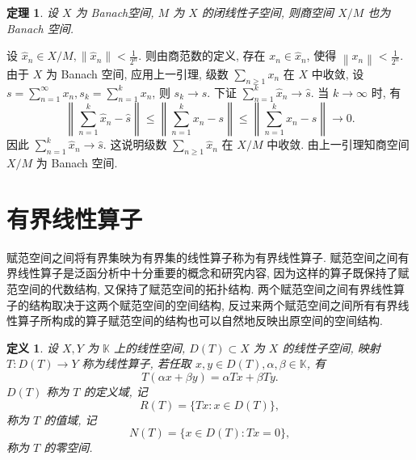 \documentclass[openany]{ctexbook}
\makeatletter
\theoremstyle{kaiti}
\newtheorem{definition}{定义}[section]
\newtheorem{theorem}{定理}[section]
\theoremstyle{normal}
\renewenvironment{proof}[1][\proofname]{\par
    \pushQED{\qed}%
    \normalfont \topsep6\p@\@plus6\p@\relax
    \trivlist
    \item\relax
    {\heiti #1}\hspace{2\labelsep}\ignorespaces
  }{%
    \popQED\endtrivlist\@endpefalse
  }
\makeatother
\begin{document}
\begin{theorem}
  设 $X$ 为 Banach空间, $M$ 为 $X$ 的闭线性子空间, 则商空间 $X / M$ 也为 Banach 空间.
\end{theorem}

\begin{proof}
设 $\hat{x}_n \in X / M,\left\|\hat{x}_n\right\|<\frac{1}{2^n}$. 则由商范数的定义, 存在 $x_n \in \hat{x}_n$, 使得 $\left\|x_n\right\|<\frac{1}{2^n}$. 由于 $X$ 为 Banach 空间, 应用上一引理, 级数 $\sum_{n \geqslant 1} x_n$ 在 $X$ 中收敛, 设 $s=\sum_{n=1}^{\infty} x_n, s_{k}=\sum_{n=1}^{k} x_n$, 则 $s_{k} \rightarrow s$. 下证 $\sum_{n=1}^{k} \hat{x}_n \rightarrow \hat{s}$. 当 $k \rightarrow \infty$ 时, 有
$$
\left\|\sum_{n=1}^{k} \hat{x}_n-\hat{s}\right\| \leqslant\left\|\sum_{n=1}^{k} x_n-s\right\| \leqslant\left\|\sum_{n=1}^{k} x_n-s\right\| \rightarrow 0.
$$
因此 $\sum_{n=1}^{k} \hat{x}_n \rightarrow \hat{s}$. 这说明级数 $\sum_{n \geqslant 1} \hat{x}_n$ 在 $X / M$ 中收敛. 由上一引理知商空间 $X / M$ 为 Banach 空间.
\end{proof}

\section{有界线性算子}

赋范空间之间将有界集映为有界集的线性算子称为有界线性算子. 赋范空间之间有界线性算子是泛函分析中十分重要的概念和研究内容, 因为这样的算子既保持了赋范空间的代数结构, 又保持了赋范空间的拓扑结构. 两个赋范空间之间有界线性算子的结构取决于这两个赋范空间的空间结构, 反过来两个赋范空间之间所有有界线性算子所构成的算子赋范空间的结构也可以自然地反映出原空间的空间结构.

\begin{definition}
设 $X, Y$ 为 $\mathbb{K}$ 上的线性空间, $D(T) \subset X$ 为 $X$ 的线性子空间, 映射 $T: D(T) \rightarrow Y$ 称为线性算子, 若任取 $x, y \in D(T), \alpha, \beta \in \mathbb{K}$, 有
$$
T(\alpha x+\beta y)=\alpha T x+\beta T y.
$$
$D(T)$ 称为 $T$ 的定义域, 记
$$
R(T)=\{T x: x \in D(T)\},
$$
称为 $T$ 的值域, 记
$$
N(T)=\{x \in D(T): T x=0\},
$$
称为 $T$ 的零空间.
\end{definition}
\end{document}
